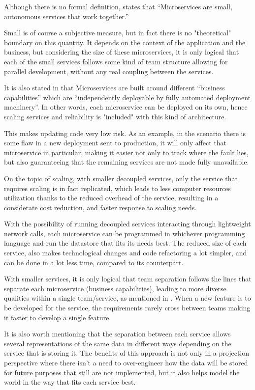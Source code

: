 Although there is no formal definition, \cite[Chapter~1]{newman2015building} states that ``Microservices are small, autonomous services that work together.''

Small is of course a subjective measure, but in fact there is no "theoretical" boundary on this quantity. It depends on the context of the application and the business, but considering the size of these microservices, it is only logical that each of the small services follows some kind of team structure allowing for parallel development, without any real coupling between the services. 

It is also stated in \cite{MartinFowlerMicroservices} that Microservices are built around different ``business capabilities'' which are ``independently deployable by fully automated deployment machinery''. In other words, each microservice can be deployed on its own, hence scaling services and reliability is "included" with this kind of architecture. 

This makes updating code very low risk. As an example, in the scenario there is some flaw in a new deployment sent to production, it will only affect that microservice in particular, making it easier not only to track where the fault lies, but also guaranteeing that the remaining services are not made fully unavailable.

On the topic of scaling, with smaller decoupled services, only the service that requires scaling is in fact replicated, which leads to less computer resources utilization thanks to the reduced overhead of the service, resulting in a considerate cost reduction, and faster response to scaling needs.

With the possibility of running decoupled services interacting through lightweight network calls, each microservice can be programmed in whichever programming language and run the datastore that fits its needs best. The reduced size of each service, also makes technological changes and code refactoring a lot simpler, and can be done in a lot less time, compared to its counterpart.

With smaller services, it is only logical that team separation follows the lines that separate each microservice (business capabilities), leading to more diverse qualities within a single team/service, as mentioned in \cite{MartinFowlerMicroservices}. When a new feature is to be developed for the service, the requirements rarely cross between teams making it faster to develop a single feature.

It is also worth mentioning that the separation between each service allows several representations of the same data in different ways depending on the service that is storing it. The benefits of this approach is not only in a projection perspective where there isn't a need to over-engineer how the data will be stored for future purposes that still are not implemented, but it also helps model the world in the way that fits each service best.

